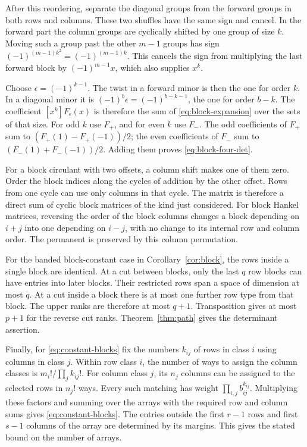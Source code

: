 \documentclass[11pt,reqno]{amsart}
\theoremstyle{remark}
\numberwithin{equation}{section}
\begin{document}
After this reordering, separate the diagonal groups from the forward
groups in both rows and columns. These two shuffles have the same sign
and cancel. In the forward part the column groups are cyclically shifted
by one group of size \(k\). Moving such a group past the other \(m-1\)
groups has sign \((-1)^{(m-1)k^2}=(-1)^{(m-1)k}\). This cancels the sign
from multiplying the last forward block by \((-1)^{m-1}x\), which also
supplies \(x^k\).

Choose \(\epsilon=(-1)^{k-1}\). The twist in a forward minor is then the
one for order \(k\). In a diagonal minor it is
\((-1)^b\epsilon=(-1)^{b-k-1}\), the one for order \(b-k\). The
coefficient \([x^k]F_\epsilon(x)\) is therefore the sum of
\eqref{eq:block-expansion} over the sets of that size. For odd \(k\) use
\(F_+\), and for even \(k\) use \(F_-\). The odd coefficients of \(F_+\)
sum to \((F_+(1)-F_+(-1))/2\); the even coefficients of \(F_-\) sum to
\((F_-(1)+F_-(-1))/2\). Adding them proves \eqref{eq:block-four-det}.

For a block circulant with two offsets, a column shift makes one of them
zero. Order the block indices along the cycles of addition by the other
offset. Rows from one cycle can use only columns in that cycle. The
matrix is therefore a direct sum of cyclic block matrices of the kind
just considered. For block Hankel matrices, reversing the order of the
block columns changes a block depending on \(i+j\) into one depending on
\(i-j\), with no change to its internal row and column order. The
permanent is preserved by this column permutation.

For the banded block-constant case in Corollary~\ref{cor:block}, the rows
inside a single block are identical. At a cut between blocks, only the
last \(q\) row blocks can have entries into later blocks. Their
restricted rows span a space of dimension at most \(q\). At a cut inside
a block there is at most one further row type from that block. The upper
ranks are therefore at most \(q+1\). Transposition gives at most \(p+1\)
for the reverse cut ranks. Theorem~\ref{thm:path} gives the determinant
assertion.

Finally, for \eqref{eq:constant-blocks} fix the numbers \(k_{ij}\) of
rows in class \(i\) using columns in class \(j\). Within row class \(i\),
the number of ways to assign the column classes is \(m_i!/\prod_j
k_{ij}!\). For column class \(j\), its \(n_j\) columns can be assigned to
the selected rows in \(n_j!\) ways. Every such matching has weight
\(\prod_{i,j}b_{ij}^{k_{ij}}\). Multiplying these factors and summing
over the arrays with the required row and column sums gives
\eqref{eq:constant-blocks}. The entries outside the first \(r-1\) rows
and first \(s-1\) columns of the array are determined by its margins.
This gives the stated bound on the number of arrays.
\end{document}
